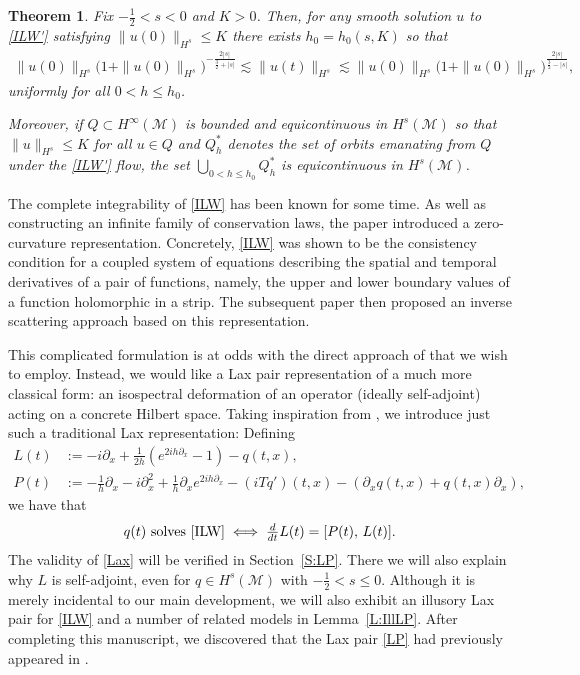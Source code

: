 \documentclass{amsart}
\newtheorem{theorem}{Theorem}[section]
\theoremstyle{definition}
\theoremstyle{remark}
\begin{document}
\begin{theorem}\label{T2}
Fix $-\frac12< s <0$ and \(K>0\).  Then, for any smooth solution $u$ to \eqref{ILW'} satisfying \(\|u(0)\|_{H^s}\leq K\) there exists \(h_0 = h_0(s,K)\) so that
\begin{align}\label{a priori bdds''}
\| u(0) \|_{H^s} \bigl( 1 +  \| u(0) \|_{H^s}\bigr)^{-\frac{2|s|}{\frac32+|s|}} \lesssim \| u(t) \|_{H^s} \lesssim \| u(0) \|_{H^s} \bigl( 1 +  \| u(0) \|_{H^s}\bigr)^{\frac{2|s|}{\frac32-|s|}},
\end{align}
uniformly for all \(0<h\leq h_0\).

Moreover, if $Q\subset H^\infty(\mathcal M)$ is bounded and equicontinuous in $H^{s}(\mathcal M)$ so that \(\|u\|_{H^s}\leq K\) for all \(u\in Q\) and \(Q_h^*\) denotes the set of orbits emanating from $Q$ under the \eqref{ILW'} flow, the set \(\bigcup_{0<h\leq h_0}Q_h^*\) is equicontinuous in $H^{s}(\mathcal M)$.
\end{theorem}

The complete integrability of \eqref{ILW} has been known for some time.  As well as constructing an infinite family of conservation laws, the paper \cite{MR0591811} introduced a zero-curvature representation.  Concretely, \eqref{ILW} was shown to be the consistency condition for a coupled system of equations describing the spatial and temporal derivatives of a pair of functions, namely, the upper and lower boundary values of a function holomorphic in a strip.
The subsequent paper \cite{YAS} then proposed an inverse scattering approach based on this representation.

This complicated formulation is at odds with the direct approach of \cite{KVZ} that we wish to employ.  Instead, we would like a Lax pair representation of a much more classical form: an isospectral deformation of an operator (ideally self-adjoint) acting on a concrete Hilbert space.  Taking inspiration from \cite{YAS,MR0591811}, we introduce just such a traditional Lax representation:  Defining
\begin{equation}\label{LP}\begin{aligned}
L(t) &:= -i\partial_x + \tfrac1{2h}(e^{2ih\partial_x}-1) - q(t,x), \\
P(t) &:= -\tfrac1h \partial_x -i \partial_x^2  + \tfrac1h\partial_x e^{2ih\partial_x} - (iTq')(t,x) - (\partial_x q(t,x) +q(t,x)\partial_x),
\end{aligned}\end{equation}
we have that
\begin{align}
\text{$q(t)$ solves \eqref{ILW}} \iff \tfrac{d}{dt} L(t) = [P(t),\, L(t)].        \label{Lax}
\end{align}
The validity of \eqref{Lax} will be verified in Section~\ref{S:LP}.  There we will also explain why $L$ is self-adjoint, even for $q\in H^s(\mathcal M)$ with $-\frac12<s\leq 0$.  Although it is merely incidental to our main development, we will also exhibit an illusory Lax pair for \eqref{ILW} and a number of related models in Lemma~\ref{L:IllLP}.  After completing this manuscript, we discovered that the Lax pair \eqref{LP} had previously appeared in \cite{MR597631}.
\end{document}
